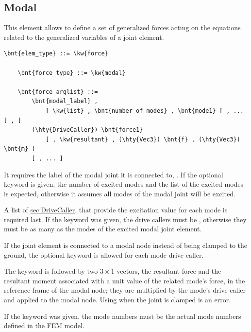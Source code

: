 \subsection{Modal}
\label{sec:ModalForceJoint}
This element allows to define a set of generalized forces
acting on the equations related to the generalized variables
of a  joint element.
\begin{Verbatim}[commandchars=\\\{\}]
    \bnt{elem_type} ::= \kw{force}

    \bnt{force_type} ::= \kw{modal}

    \bnt{force_arglist} ::=
        \bnt{modal_label} ,
            [ \kw{list} , \bnt{number_of_modes} , \bnt{mode1} [ , ... ] , ]
        (\hty{DriveCaller}) \bnt{force1}
            [ , \kw{resultant} , (\hty{Vec3}) \bnt{f} , (\hty{Vec3}) \bnt{m} ]
        [ , ... ]
\end{Verbatim}
It requires the label of the modal joint it is connected to,
.
If the optional keyword  is given, the number of excited modes
 and the list of the excited modes is expected,
otherwise it assumes all modes of the  modal joint
will be excited.

A list of
\hyperref{\kw{drive callers}}{\kw{drive callers} (see Section~}{)}{sec:DriveCaller}.
that provide the excitation value for each mode is required last.
If the keyword  was given, the drive callers
must be , otherwise they must be as many
as the modes of the excited modal joint element.

If the  joint element is connected to a modal node
instead of being clamped to the ground, the optional keyword 
is allowed for each mode drive caller.

The keyword  is followed by two $3\times 1$ vectors,
the resultant force and the resultant moment
associated with a unit value of the related mode's force,
in the reference frame of the modal node;
they are multiplied by the mode's drive caller
and applied to the modal node.
Using  when the  joint is clamped is an error.


If the keyword  was given, the mode numbers must be
the actual mode numbers defined in the FEM model.

